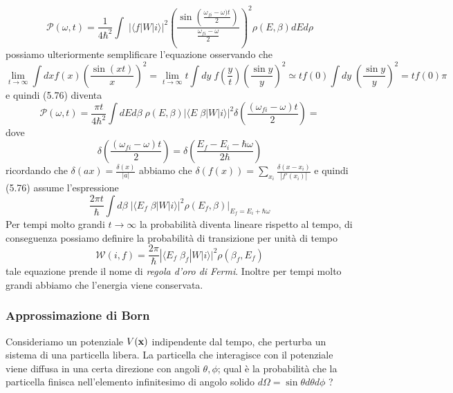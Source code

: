 \begin{equation}
	\mathcal{P}(\omega,t) = \frac{1}{4 \hbar^2} \int  \; |\langle f|W|i \rangle|^2 \left(  \frac{\sin \left (\frac{\omega_{fi}-\omega)t}{2}\right )}{\frac{\omega_{fi}-\omega}{2}}\right)^2 \rho(E,\beta)dE d\rho
\end{equation}
possiamo ulteriormente semplificare l'equazione osservando che 
\begin{equation*}
	\lim_{t \to \infty} \int dxf(x) \left(\frac{\sin(xt)}{x}\right)^2 = \lim_{t \to \infty} t \int dy \; f\left (\frac{y}{t} \right )\left( \frac{\sin y}{y}\right)^2 \simeq  tf(0) \int dy\; \left(\frac{\sin y}{y}\right)^2 = tf(0)\pi 
\end{equation*}
e quindi (5.76) diventa 
\begin{equation*}
	\mathcal{P}(\omega,t) = \frac{\pi t}{4 \hbar^2}\int dEd\beta \;\rho(E,\beta)|\langle E \;\beta|W|i \rangle|^2\delta \left(\frac{(\omega_{fi}-\omega)t}{2}\right)=
\end{equation*}
dove 
\begin{equation*}
	\delta \left( \frac{(\omega_{fi}-\omega)t}{2}\right) = \delta \left( \frac{E_{f}-E_{i} - \hbar \omega}{2 \hbar}\right) 
\end{equation*}
ricordando che $\delta(ax) = \frac{\delta(x)}{|a|}$ abbiamo che $\delta(f(x)) = \sum_{x_i} \frac{\delta(x-x_i)}{|f'(x_i)|}$ e quindi (5.76) assume l'espressione
\begin{equation}
	\frac{2\pi t}{ \hbar } \int d\beta \; |\langle E_f \;\beta|W|i \rangle|^2 \rho(E_f,\beta) \Bigg \vert_{E_f = E_i + \hbar \omega}
\end{equation}
Per tempi molto grandi $t \to \infty$ la probabilit\`a diventa lineare rispetto al tempo, di conseguenza possiamo definire la probabilit\`a di transizione per unit\`a di tempo 
\begin{equation}
	\mathcal{W}(i,f) = \frac{2\pi}{ \hbar}|\langle E_{f} \; \beta_f | W|i \rangle |^2 \rho(\beta_f,E_f)
\end{equation}
tale equazione prende il nome di \textit{regola d'oro di Fermi}. Inoltre per tempi molto grandi abbiamo che l'energia viene conservata.

\subsubsection{Approssimazione di Born}
 
 Consideriamo un potenziale $V(\bold{x})$  indipendente dal tempo, che perturba un sistema di una particella libera. La particella che interagisce con il potenziale viene diffusa in una certa direzione con angoli $\theta,\phi$; qual \`e la probabilit\`a che la particella finisca nell'elemento infinitesimo di angolo solido $d \Omega = \sin \theta d\theta d \phi$ ?
 
